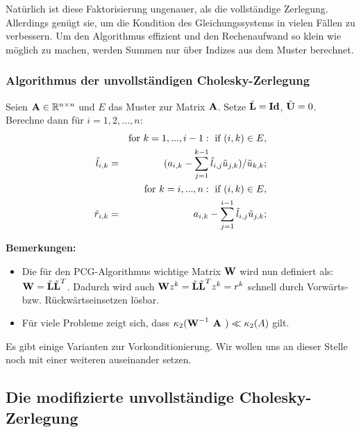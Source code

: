 Natürlich ist diese Faktorisierung ungenauer, als die vollständige Zerlegung. Allerdings genügt sie, um die Kondition des Gleichungssystems in vielen Fällen zu verbessern. Um den Algorithmus effizient und den Rechenaufwand so klein wie möglich zu machen, werden Summen nur über Indizes aus dem Muster berechnet.

\subsubsection{Algorithmus der unvollständigen Cholesky-Zerlegung}\label{sss.Cholesky-Algorithmus}

Seien ${\textbf{A}} \in \mathbb{R}^{n \times n}$ und $E$ das Muster zur Matrix ${\textbf{A}}$. Setze $\tilde{{\textbf{L}}} = {\textbf{Id}}$, $\tilde{{\textbf{U}}} = 0$. Berechne dann für $i=1,2,...,n$:
\begin{eqnarray}
&&\textnormal{for } k = 1,...,i-1: \textnormal{ if } (i,k) \in E,\notag \\
\tilde l_{i,k} &=& (a_{i,k} - \sum_{j=1}^{k-1} \tilde l_{i,j} \tilde u_{j,k})/ \tilde u_{k,k}; \notag \\
&&\textnormal{for } k = i,...,n: \textnormal{ if } (i,k) \in E, \notag \\
\tilde r_{i,k} &=& a_{i,k} - \sum_{j=1}^{i-1} \tilde l_{i,j} \tilde u_{j,k}; \notag
\end{eqnarray}

\textbf{Bemerkungen:}

\begin{itemize}
\item Die für den PCG-Algorithmus wichtige Matrix ${\textbf{W}}$ wird nun definiert als: ${\textbf{W}} = \tilde{{\textbf{L}}} \tilde{{\textbf{L}}}^{T}$. Dadurch wird auch ${\textbf{W}}z^{k} = \tilde{{\textbf{L}}} \tilde{{\textbf{L}}}^{T}z^{k} = r^{k}$ schnell durch Vorwärts- bzw. Rückwärtseinsetzen lösbar.
\item Für viele Probleme zeigt sich, dass $\kappa_{2}({\textbf{W}}^{-1} {\textbf{ {\textbf{A}} }}) \ll \kappa_{2} (A)$ gilt. \\
\end{itemize}

Es gibt einige Varianten zur Vorkonditionierung. Wir wollen uns an dieser Stelle noch mit einer weiteren auseinander setzen.

\subsection{Die modifizierte unvollständige Cholesky-Zerlegung}\label{ss.Modifizierte Cholesky}

